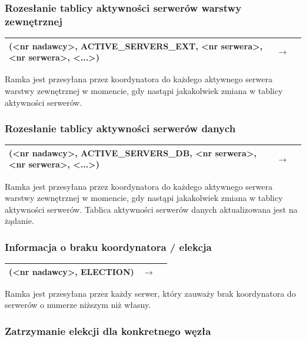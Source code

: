 \subsubsection{Rozesłanie tablicy aktywności serwerów warstwy zewnętrznej}

\begin{longtable}{| p{} | p{}| p{} |} 
\hline
(<nr nadawcy>, ACTIVE\_SERVERS\_EXT, <nr serwera>, <nr serwera>, <...>) & $\rightarrow$ &  \\ \hline
\end{longtable}

Ramka jest przesyłana przez koordynatora do każdego aktywnego serwera warstwy zewnętrznej w momencie, gdy nastąpi jakakolwiek zmiana w tablicy aktywności serwerów.

\subsubsection{Rozesłanie tablicy aktywności serwerów danych}

\begin{longtable}{| p{} | p{}| p{} |} 
\hline
(<nr nadawcy>, ACTIVE\_SERVERS\_DB, <nr serwera>, <nr serwera>, <...>) & $\rightarrow$ &  \\ \hline
\end{longtable}

Ramka jest przesyłana przez koordynatora do każdego aktywnego serwera warstwy zewnętrznej w momencie, gdy nastąpi jakakolwiek zmiana w tablicy aktywności serwerów. Tablica aktywności serwerów danych aktualizowana jest na żądanie.

\subsubsection{Informacja o braku koordynatora / elekcja}

\begin{longtable}{| p{} | p{}| p{} |} 
\hline
(<nr nadawcy>, ELECTION) & $\rightarrow$ &  \\ \hline
\end{longtable}

Ramka jest przesyłana przez każdy serwer, który zauważy brak koordynatora do serwerów o numerze niższym niż własny.

\subsubsection{Zatrzymanie elekcji dla konkretnego węzła}

